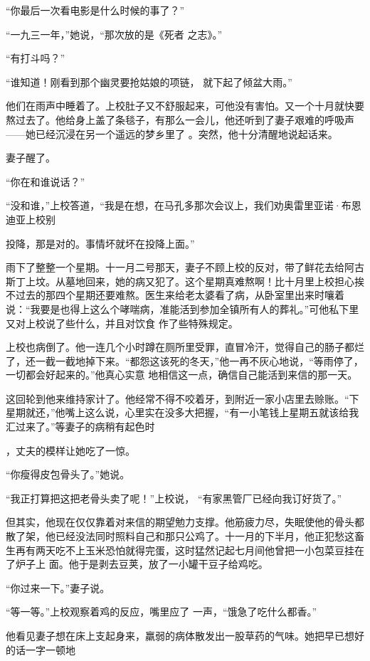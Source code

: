 \documentclass{article}
\begin{document}
“你最后一次看电影是什么时候的事了？” 

“一九三一年，”她说，“那次放的是《死者
之志》。” 


“有打斗吗？” 

“谁知道！刚看到那个幽灵要抢姑娘的项链，
就下起了倾盆大雨。” 

他们在雨声中睡着了。上校肚子又不舒服起来，可他没有害怕。又一个十月就快要熬过去了。他给身上盖了条毯子，有那么一会儿，他还听到了妻子艰难的呼吸声——她已经沉浸在另一个遥远的梦乡里了
。突然，他十分清醒地说起话来。 


妻子醒了。 


“你在和谁说话？” 

“没和谁，”上校答道，“我是在想，在马孔多那次会议上，我们劝奥雷里亚诺·布恩迪亚上校别
\newpage

投降，那是对的。事情坏就坏在投降上面。” 

雨下了整整一个星期。十一月二号那天，妻子不顾上校的反对，带了鲜花去给阿古斯丁上坟。从墓地回来，她的病又犯了。这个星期真难熬啊！比十月里上校担心挨不过去的那四个星期还要难熬。医生来给老太婆看了病，从卧室里出来时嚷着说：“我要是也得上这么个哮喘病，准能活到参加全镇所有人的葬礼。”可他私下里又对上校说了些什么，并且对饮食
作了些特殊规定。 

上校也病倒了。他一连几个小时蹲在厕所里受罪，直冒冷汗，觉得自己的肠子都烂了，还一截一截地掉下来。“都怨这该死的冬天，”他一再不灰心地说，“等雨停了，一切都会好起来的。”他真心实意
地相信这一点，确信自己能活到来信的那一天。 

这回轮到他来维持家计了。他经常不得不咬着牙，到附近一家小店里去赊账。“下星期就还，”他嘴上这么说，心里实在没多大把握，“有一小笔钱上星期五就该给我汇过来了。”等妻子的病稍有起色时
\newpage

，丈夫的模样让她吃了一惊。 


“你瘦得皮包骨头了。”她说。 

“我正打算把这把老骨头卖了呢！”上校说，
“有家黑管厂已经向我订好货了。” 

但其实，他现在仅仅靠着对来信的期望勉力支撑。他筋疲力尽，失眠使他的骨头都散了架，他已经没法同时照料自己和那只公鸡了。十一月的下半月，他正犯愁这畜生再有两天吃不上玉米恐怕就得完蛋，这时猛然记起七月间他曾把一小包菜豆挂在了炉子上
面。他于是剥去豆荚，放了一小罐干豆子给鸡吃。 


“你过来一下。”妻子说。 

“等一等。”上校观察着鸡的反应，嘴里应了
一声，“饿急了吃什么都香。” 

他看见妻子想在床上支起身来，羸弱的病体散发出一股草药的气味。她把早已想好的话一字一顿地
\newpage
\end{document}
